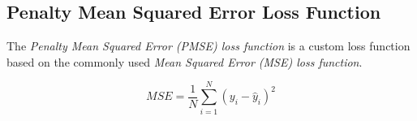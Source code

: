   \subsection{Penalty Mean Squared Error Loss Function}
  \label{sec:penalty-mse-loss-function-architecture-and-implementation}

    The \emph{Penalty Mean Squared Error (PMSE) loss function} is a custom loss function based on the commonly used \emph{Mean Squared Error (MSE) loss function}.

    

    $$MSE = \frac{1}{N} \sum_{i = 1}^{N}\left(y_i - \hat{y}_i\right)^2$$

